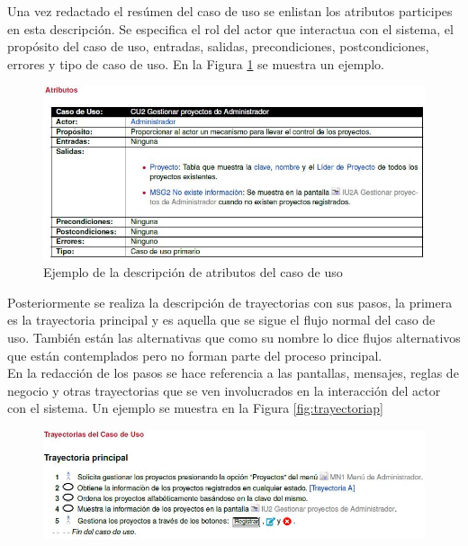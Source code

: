 Una vez redactado el resúmen del caso de uso se enlistan los atributos participes en esta descripción. Se especifica el rol del actor que interactua con el sistema, el propósito del caso de uso, entradas, salidas, precondiciones, postcondiciones, errores y tipo de caso de uso. En la Figura \ref{fig:atri} se muestra un ejemplo.

\begin{figure}[H]
	\begin{center}
		\includegraphics[width=1\textwidth]{images/marcoteorico/atributos}
		\caption{Ejemplo de la descripción de atributos del caso de uso}
		\label{fig:atri}
	\end{center}
\end{figure}

Posteriormente se realiza la descripción de trayectorias con sus pasos, la primera es la trayectoria principal y es aquella que se sigue el flujo normal del caso de uso. También están las alternativas que como su nombre lo dice flujos alternativos que están contemplados pero no forman parte del proceso principal.\\

En la redacción de los pasos se hace referencia a las pantallas, mensajes, reglas de negocio y otras trayectorias que se ven involucrados en la interacción del actor con el sistema.
Un ejemplo se muestra en la Figura \ref{fig:trayectoriap}

\begin{figure}[H]
	\begin{center}
		\includegraphics[width=1\textwidth]{images/marcoteorico/trayectorias}
	\end{center}
\end{figure}

